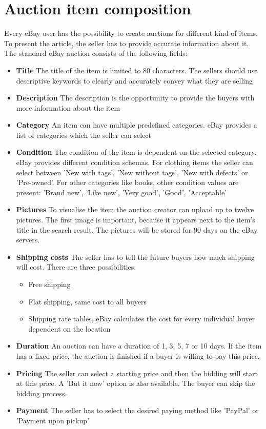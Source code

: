 \section{Auction item composition}
Every eBay user has the possibility to create auctions for different kind of items. To present the article, the seller has to provide accurate information about it. The standard eBay auction consists of the following fields:
\begin{itemize}
	\item \textbf{Title} The title of the item is limited to 80 characters. The sellers should use descriptive keywords to clearly and accurately convey what they are selling
	\item \textbf{Description} The description is the opportunity to provide the buyers with more information about the item
	\item \textbf{Category} An item can have multiple predefined categories. eBay provides a list of categories which the seller can select
	\item \textbf{Condition} The condition of the item is dependent on the selected category. eBay provides different condition schemas. For clothing items the seller can select between 'New with tags', 'New without tags', 'New with defects' or 'Pre-owned'. For other categories like books, other condition values are present: 'Brand new', 'Like new', 'Very good', 'Good', 'Acceptable'
	\item \textbf{Pictures} To visualise the item the auction creator can upload up to twelve pictures. The first image is important, because it appears next to the item's title in the search result. The pictures will be stored for 90 days on the eBay servers.
	\item \textbf{Shipping costs} The seller has to tell the future buyers how much shipping will cost. There are three possibilities:
	\begin{itemize}
		\item Free shipping
		\item Flat shipping, same cost to all buyers
		\item Shipping rate tables, eBay calculates the cost for every individual buyer dependent on the location
	\end{itemize}
	\item \textbf{Duration} An auction can have a duration of 1, 3, 5, 7 or 10 days. If the item has a fixed price, the auction is finished if a buyer is willing to pay this price.
	\item \textbf{Pricing} The seller can select a starting price and then the bidding will start at this price. A 'But it now' option is also available. The buyer can skip the bidding process.
	\item \textbf{Payment} The seller has to select the desired paying method like 'PayPal' or 'Payment upon pickup'
\end{itemize}


